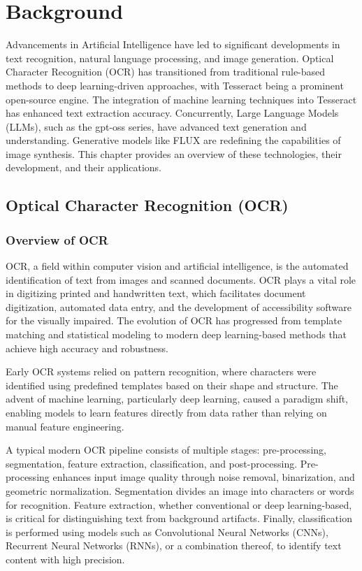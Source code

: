 \chapter{Background}

Advancements in Artificial Intelligence have led to significant developments in text recognition, natural language processing, and image generation. Optical Character Recognition (OCR) has transitioned from traditional rule-based methods to deep learning-driven approaches, with Tesseract being a prominent open-source engine. The integration of machine learning techniques into Tesseract has enhanced text extraction accuracy. Concurrently, Large Language Models (LLMs), such as the gpt-oss series, have advanced text generation and understanding. Generative models like FLUX are redefining the capabilities of image synthesis. This chapter provides an overview of these technologies, their development, and their applications.

\section{Optical Character Recognition (OCR)}
\subsection{Overview of OCR}
OCR, a field within computer vision and artificial intelligence, is the automated identification of text from images and scanned documents. OCR plays a vital role in digitizing printed and handwritten text, which facilitates document digitization, automated data entry, and the development of accessibility software for the visually impaired. The evolution of OCR has progressed from template matching and statistical modeling to modern deep learning-based methods that achieve high accuracy and robustness.

Early OCR systems relied on pattern recognition, where characters were identified using predefined templates based on their shape and structure. The advent of machine learning, particularly deep learning, caused a paradigm shift, enabling models to learn features directly from data rather than relying on manual feature engineering.

A typical modern OCR pipeline consists of multiple stages: pre-processing, segmentation, feature extraction, classification, and post-processing. Pre-processing enhances input image quality through noise removal, binarization, and geometric normalization. Segmentation divides an image into characters or words for recognition. Feature extraction, whether conventional or deep learning-based, is critical for distinguishing text from background artifacts. Finally, classification is performed using models such as Convolutional Neural Networks (CNNs), Recurrent Neural Networks (RNNs), or a combination thereof, to identify text content with high precision.

